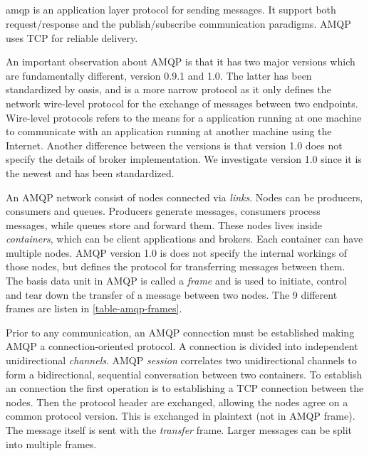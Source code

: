 \subsection{}

\gls{amqp} is an application layer protocol for sending messages. It support
both request/response and the publish/subscribe communication paradigms. AMQP
uses TCP for reliable delivery.

 An important observation about AMQP is that it has two major versions which are
 fundamentally different, version 0.9.1 and 1.0. The latter has been
 standardized by \gls{oasis}\cite{oasis-amqp}, and is a  more narrow protocol as
 it only defines the network wire-level protocol for the exchange of messages
 between two endpoints. Wire-level protocols refers to the means for a
 application running at one machine to communicate with an application running
 at another machine using the Internet. Another difference between the versions
 is that version 1.0 does not specify the details of broker implementation. We
 investigate version 1.0 since it is the newest and has been standardized.

An AMQP network consist of nodes connected via \textit{links}. Nodes can be
producers, consumers and queues. Producers generate messages, consumers process
messages, while queues store and forward them. These nodes lives inside
\textit{containers}, which can be client applications and brokers. Each
container can have multiple nodes. AMQP version 1.0 is does not specify the
internal workings of those nodes, but defines the protocol for transferring
messages between them. The basis data unit in AMQP is called a \textit{frame}
and is used to initiate, control and tear down the transfer of a message between
two nodes. The 9 different frames are listen in \cref{table-amqp-frames}.

Prior to any communication, an AMQP connection must be established making AMQP a
connection-oriented protocol. A connection is divided into independent
unidirectional \textit{channels}. AMQP \textit{session} correlates two
unidirectional channels to form a bidirectional, sequential conversation between
two containers. To establish an connection the first operation is to
establishing a TCP connection between the nodes. Then the protocol header are
exchanged, allowing the nodes agree on a common protocol version. This is
exchanged in plaintext (not in AMQP frame). The message itself is sent with the
\textit{transfer} frame. Larger messages can be split into multiple frames.


